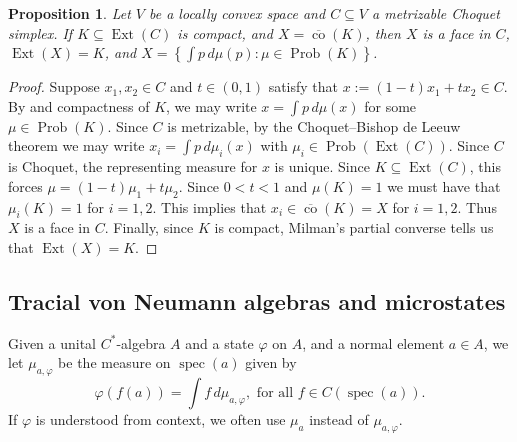 \documentclass[10pt]{amsart}
\newtheorem{prop}[thm]{Proposition}
\theoremstyle{definition}
\numberwithin{equation}{section}
\DeclareMathOperator{\Ext}{Ext}
\DeclareMathOperator{\Prob}{Prob}
\DeclareMathOperator{\co}{co}
\DeclareMathOperator{\spec}{spec}
\begin{document}
\begin{prop}\label{prop: creating faces}
Let $V$ be a locally convex space and $C\subseteq V$ a metrizable Choquet simplex. If $K\subseteq \Ext(C)$ is compact, and $X=\overline{\co}(K)$, then $X$ is a face in $C$,  $\Ext(X)=K$, and $X=\left\{\int p\,d\mu(p):\mu \in \Prob(K)\right\}$. 
\end{prop}

\begin{proof}
Suppose $x_{1},x_{2}\in C$ and $t\in (0,1)$ satisfy that $x:=(1-t)x_{1}+tx_{2}\in C$. By \cite[Theorem 3.28]{GrandpaRudin} and compactness of $K$, we may write $x=\int p\,d\mu(x)$ for some $\mu\in \Prob(K)$. Since $C$ is metrizable, by the Choquet–Bishop de Leeuw theorem \cite[Theorem I.4.8 and Corollary I.4.9]{ChoquetTheory} we may write $x_{i}=\int p\,d\mu_{i}(x)$ with $\mu_{i}\in \Prob(\Ext(C))$. Since $C$ is Choquet, the representing measure for $x$ is unique. Since $K\subseteq \Ext(C)$, this forces $\mu=(1-t)\mu_{1}+t\mu_{2}$. Since $0<t<1$ and $\mu(K)=1$ we must have that $\mu_{i}(K)=1$ for $i=1,2$. This implies that $x_{i}\in \overline{\co}(K)=X$ for $i=1,2$. Thus $X$ is a face in $C$. Finally, since $K$ is compact, Milman's partial converse \cite[Theorem V.7.8]{Conway} tells us that $\Ext(X)=K$. 

\end{proof}



\subsection{Tracial von Neumann algebras and microstates}\label{sec: all praise the OG}

Given a unital $C^{*}$-algebra $A$ and a state $\varphi$ on $A$, and a normal element $a\in A$, we let $\mu_{a,\varphi}$ be the measure on $\spec(a)$ given by
\[\varphi(f(a))=\int f\,d\mu_{a,\varphi}, \text{ for all $f\in C(\spec(a))$.}\]
If $\varphi$ is understood from context, we often use $\mu_{a}$ instead of $\mu_{a,\varphi}$.

\end{document}
